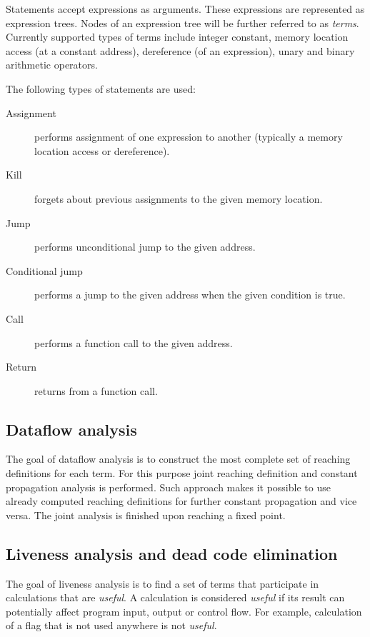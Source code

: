\documentclass[10pt, conference, compsocconf]{IEEEtran}
\newcommand{\compact}{}
\newcommand{\skipspace}{}
\newcommand{\skipsectionspace}{}
\begin{document}
Statements accept expressions as arguments.
These expressions are represented as expression trees.
Nodes of an expression tree will be further referred to as \emph{terms}.
Currently supported types of terms include integer
constant, memory location access (at a constant address),
dereference (of an expression), unary and binary arithmetic
operators.

The following types of statements are used:
\skipspace\begin{description}\compact
\item[Assignment] performs assignment of one expression to another (typically a memory location access or dereference).
\item[Kill] forgets about previous assignments to the given memory location.
\item[Jump] performs unconditional jump to the given address.
\item[Conditional jump] performs a jump to the given address when the given condition is true.
\item[Call] performs a function call to the given address.
\item[Return] returns from a function call.
\end{description}


\subsection{Dataflow analysis}\skipsectionspace
The goal of dataflow analysis is to construct the most complete set of reaching definitions for each term.
For this purpose joint reaching definition and constant propagation analysis \cite{muchnick97} is performed.
Such approach makes it possible to use already computed reaching definitions for further constant propagation and vice versa.
The joint analysis is finished upon reaching a fixed point.


\subsection{Liveness analysis and dead code elimination}\skipsectionspace
The goal of liveness analysis is to find a set of terms that participate in 
calculations that are \textit{useful}. 
A calculation is considered \textit{useful} if its result can potentially 
affect program input, output or control flow. 
For example, calculation of a flag that is not used anywhere is not \textit{useful}.
\end{document}
